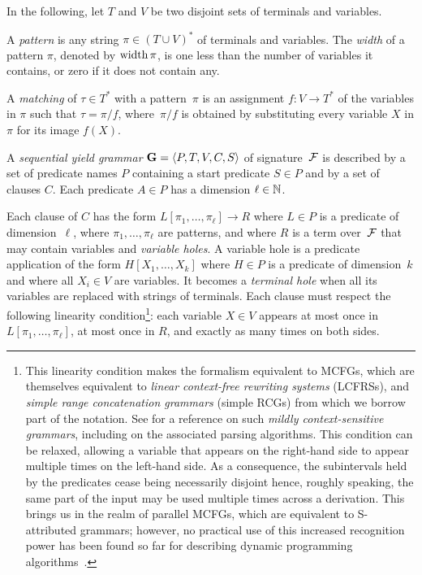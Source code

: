 \begin{definition}
    In the following, let \(T\) and \(V\) be two disjoint sets of terminals and variables.

    A \emph{pattern} is any string \(\pi \in (T \cup V)^*\) of terminals and variables.
    The \emph{width} of a pattern \(\pi\), denoted by \(\operatorname{width}\pi\), is one less than the number of variables it contains, or zero if it does not contain any.

    A \emph{matching} of \(\tau \in T^*\) with a pattern~\(\pi\) is an assignment \(f : V \rightarrow T^*\) of the variables in \(\pi\)
    such that \(\tau = \pi / f\),
    where~\(\pi / f\) is obtained by substituting every variable \(X\) in \(\pi\) for its image \(f(X)\).

    A \emph{sequential yield grammar} \(\mathbf{G} = \left\langle P, T, V, C, S\right\rangle\) of signature~\(\mathcal{F}\) is described
    by a set of predicate names \(P\) containing a start predicate \(S \in P\)
    and by a set of clauses \(C\).
    Each predicate \(A \in P\) has a dimension \(\ell \in \mathbb{N}\).

    Each clause of \(C\) has the form \(L[\pi_1, \ldots, \pi_\ell] \rightarrow R\)
    where \(L \in P\) is a predicate of dimension~\(\ell\),
    where \(\pi_1, \ldots, \pi_\ell\) are patterns,
    and where \(R\) is a term over~\(\mathcal{F}\) that may contain variables and \emph{variable holes}.
    A variable hole is a predicate application of the form \(H[X_1, \ldots, X_k]\)
    where \(H \in P\) is a predicate of dimension~\(k\)
    and where all \(X_i \in V\) are variables.
    It becomes a \emph{terminal hole} when all its variables are replaced with strings of terminals.
    Each clause must respect the following linearity condition\footnote{
        This linearity condition makes the formalism equivalent to MCFGs, which are themselves equivalent to \emph{linear context-free rewriting systems} (LCFRSs), and \emph{simple range concatenation grammars} (simple RCGs) from which we borrow part of the notation.
        See \textcite{Kallmeyer2010ParsingBeyondContext} for a reference on such \emph{mildly context-sensitive grammars}, including on the associated parsing algorithms.
        This condition can be relaxed, allowing a variable that appears on the right-hand side to appear multiple times on the left-hand side.
        As a consequence, the subintervals held by the predicates cease being necessarily disjoint hence, roughly speaking, the same part of the input may be used multiple times across a derivation.
        This brings us in the realm of parallel MCFGs, which are equivalent to S-attributed grammars; however, no practical use of this increased recognition power has been found so far for describing dynamic programming algorithms~\parencite{Riechert2016AlgebraicDynamicProgramming}.
    }:
    each variable \(X \in V\) appears
    at most once in \(L[\pi_1, \ldots, \pi_\ell]\),
    at most once in \(R\),
    and exactly as many times on both sides.


\end{definition}
